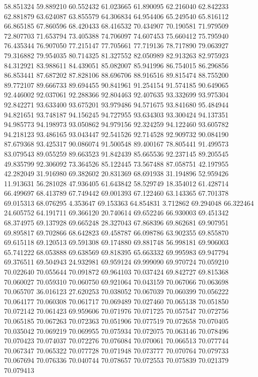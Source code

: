 58.851324
59.889210
60.552432
61.023665
61.890095
62.216040
62.842233
62.881879
63.624087
63.855579
64.306834
64.954406
65.249540
65.816112
66.865185
67.860596
68.420433
68.416532
70.434907
70.190581
71.979509
72.807703
71.653794
73.405388
74.706097
74.607453
75.660412
75.795940
76.435344
76.907050
77.215147
77.705661
77.719136
78.717890
79.063927
79.316882
79.954035
80.714325
81.327552
82.050989
82.913263
82.975923
84.312921
83.988611
84.439051
85.082007
85.941996
86.754015
86.296856
86.853441
87.687202
87.828106
88.696706
88.916516
89.815474
88.755200
89.772107
89.666733
89.694455
90.841961
91.254154
91.574185
90.649065
92.446002
92.037061
92.288366
92.804463
92.407635
93.332699
93.975304
92.842271
93.633400
93.675201
93.979486
94.571675
93.841680
95.484944
94.821651
93.748187
94.156245
94.727955
93.634303
93.300424
94.137351
94.985773
94.198973
93.050862
94.979156
92.324259
94.122460
93.605782
94.218123
93.486165
93.043447
92.541526
92.714528
92.909732
90.084190
87.679368
93.425317
90.086074
91.500548
89.400167
78.805441
91.499573
83.079543
89.055259
89.663523
91.842439
85.665536
92.237145
89.205545
49.835799
92.306092
73.364526
85.122445
73.567488
87.058751
42.197955
42.282049
31.916980
69.382602
20.831369
68.691938
31.194896
52.959426
11.913631
56.281028
47.936405
61.643842
58.529749
18.354012
61.428714
66.499697
68.413789
67.749442
69.001393
67.122460
63.143365
67.701378
69.015313
68.076295
4.353647
69.153363
64.854831
3.712862
69.294048
66.322464
24.605752
64.191711
69.366120
20.740614
69.652246
66.930003
69.451342
68.374975
69.137928
69.665248
28.327043
67.868396
69.862681
69.907951
69.895817
69.702866
68.642823
69.458787
66.098786
63.902355
69.855870
69.615118
69.120513
69.591308
69.174880
69.881748
56.998181
69.906003
65.741222
68.053888
69.638569
69.818395
65.663332
69.995983
69.947794
69.376511
69.504943
24.932981
69.959124
69.999090
69.970724
70.059210
70.022640
70.055644
70.091872
69.964103
70.037424
69.842727
69.815368
70.060027
70.059310
70.060750
69.921064
70.043159
70.067066
70.063698
70.065707
36.016123
27.620253
70.038052
70.067039
70.060399
70.056222
70.064177
70.060308
70.061717
70.069489
70.027460
70.065138
70.051850
70.072142
70.061423
69.959606
70.071976
70.071725
70.057547
70.072756
70.065185
70.067263
70.072363
70.051906
70.077519
70.072658
70.070405
70.035042
70.069219
70.069955
70.075934
70.072075
70.063146
70.078496
70.070423
70.074037
70.072276
70.076084
70.070061
70.066513
70.077744
70.067347
70.065322
70.077728
70.071948
70.073777
70.070764
70.079733
70.067694
70.076336
70.040744
70.078657
70.072553
70.075839
70.021379
70.079413
